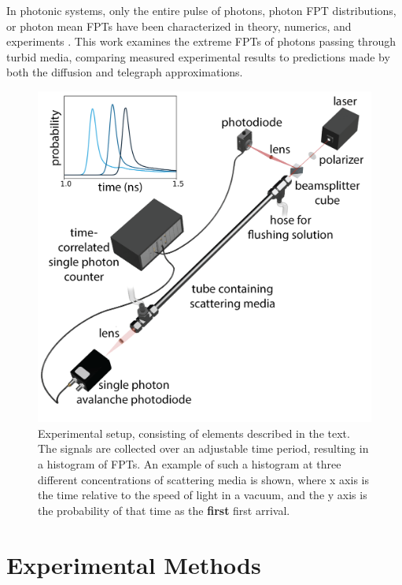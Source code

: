 \documentclass[9pt,twocolumn,twoside]{opticajnl}
\begin{document}
In photonic systems, only the entire pulse of photons, photon FPT distributions, or photon mean FPTs have been characterized in theory, numerics, and experiments \cite{lee_using_2007,calba_ultrashort_2008,madsen_experimental_1992,rossetto_isotropic_2022,saulnier_scatterer_1990,long_particle_2001,weiss_applications_2002,zeller_light_2020,ishimaru_diffusion_1978,yoo_time-resolved_1990,yoo_when_1990}. This work examines the extreme FPTs of photons passing through turbid media, comparing measured experimental results to predictions made by both the diffusion and telegraph approximations.
\begin{figure}[htp]
\includegraphics[width=\columnwidth]{exp-setup-new.png}
\caption{\label{fig:setup} Experimental setup, consisting of elements described in the text. The signals are collected over an adjustable time period, resulting in a histogram of FPTs. An example of such a histogram at three different concentrations of scattering media is shown, where x axis is the time relative to the speed of light in a vacuum, and the y axis is the probability of that time as the \textbf{first} first arrival.}
\end{figure}


\section{Experimental Methods}\label{sec:exp_meth}
\end{document}
